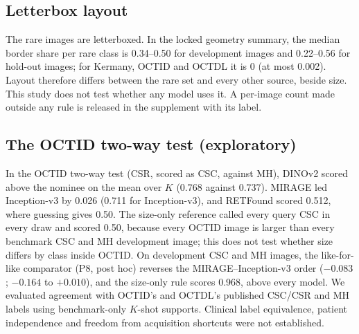 \documentclass[conference]{IEEEtran}
\begin{document}
\subsection{Letterbox layout}
\label{sec:disc-layout}
The rare images are letterboxed. In the locked geometry summary, the median border share per rare class is 0.34--0.50 for development images and 0.22--0.56 for hold-out images; for Kermany, OCTID and OCTDL it is 0 (at most 0.002). Layout therefore differs between the rare set and every other source, beside size. This study does not test whether any model uses it. A per-image count made outside any rule is released in the supplement with its label.

\subsection{The OCTID two-way test (exploratory)}
\label{sec:disc-octid}
In the OCTID two-way test (CSR, scored as CSC, against MH), DINOv2 scored above the nominee on the mean over $K$ (0.768 against 0.737). MIRAGE led Inception-v3 by 0.026 (0.711 for Inception-v3), and RETFound scored 0.512, where guessing gives 0.50. The size-only reference called every query CSC in every draw and scored 0.50, because every OCTID image is larger than every benchmark CSC and MH development image; this does not test whether size differs by class inside OCTID.
On development CSC and MH images, the like-for-like comparator (P8, post hoc) reverses the MIRAGE--Inception-v3 order ($-0.083$; $-0.164$ to $+0.010$), and the size-only rule scores 0.968, above every model. We evaluated agreement with OCTID's and OCTDL's published CSC/CSR and MH labels using benchmark-only $K$-shot supports. Clinical label equivalence, patient independence and freedom from acquisition shortcuts were not established.
\end{document}
